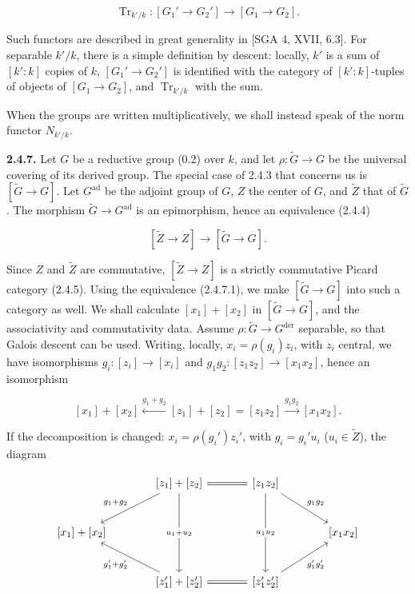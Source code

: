 \documentclass[10pt,a4paper]{article}
\begin{document}
\[
\operatorname{Tr}_{k'/k}:[G_1'\longrightarrow G_2']\longrightarrow[G_1\longrightarrow G_2]. \tag{2.4.6.1}
\]

Such functors are described in great generality in {[}SGA 4, XVII, 6.3{]}. For separable \(k'/k\), there is a simple definition by descent: locally, \(k'\) is a sum of \([k':k]\) copies of \(k\), \([G_1'\to G_2']\) is identified with the category of \([k':k]\)-tuples of objects of \([G_1\to G_2]\), and \(\operatorname{Tr}_{k'/k}\) with the sum.

When the groups are written multiplicatively, we shall instead speak of the norm functor \(N_{k'/k}\).

\textbf{2.4.7.} Let \(G\) be a reductive group (0.2) over \(k\), and let \(\rho:\widetilde G\to G\) be the universal covering of its derived group. The special case of 2.4.3 that concerns us is \([\widetilde G\to G]\). Let \(G^{\mathrm{ad}}\) be the adjoint group of \(G\), \(Z\) the center of \(G\), and \(\widetilde Z\) that of \(\widetilde G\). The morphism \(\widetilde G\to G^{\mathrm{ad}}\) is an epimorphism, hence an equivalence (2.4.4)

\[
[\widetilde Z\longrightarrow Z]\longrightarrow[\widetilde G\longrightarrow G]. \tag{2.4.7.1}
\]

Since \(Z\) and \(\widetilde Z\) are commutative, \([\widetilde Z\to Z]\) is a strictly commutative Picard category (2.4.5). Using the equivalence (2.4.7.1), we make \([\widetilde G\to G]\) into such a category as well. We shall calculate \([x_1]+[x_2]\) in \([\widetilde G\to G]\), and the associativity and commutativity data. Assume \(\rho:\widetilde G\to G^{\mathrm{der}}\) separable, so that Galois descent can be used. Writing, locally, \(x_i=\rho(g_i)z_i\), with \(z_i\) central, we have isomorphisms \(g_i:[z_i]\to[x_i]\) and \(g_1g_2:[z_1z_2]\to[x_1x_2]\), hence an isomorphism

\[
[x_1]+[x_2]\xleftarrow{g_1+g_2}[z_1]+[z_2]=[z_1z_2]\xrightarrow{g_1g_2}[x_1x_2]. \tag{2.4.7.2}
\]

If the decomposition is changed: \(x_i=\rho(g_i')z_i'\), with \(g_i=g_i'u_i\) (\(u_i\in\widetilde Z\)), the diagram

\[
\begin{tikzcd}[column sep=large,row sep=large]
& {[z_1]+[z_2]} \arrow[r,equal] \arrow[dl,"g_1+g_2"'] \arrow[dd,"u_1+u_2" description] & {[z_1z_2]} \arrow[dr,"g_1g_2"] \arrow[dd,"u_1u_2" description] & \\
{[x_1]+[x_2]} & & & {[x_1x_2]} \\
& {[z_1']+[z_2']} \arrow[r,equal] \arrow[ul,"g_1'+g_2'"] & {[z_1'z_2']} \arrow[ur,"g_1'g_2'"'] &
\end{tikzcd}
\]
\end{document}
